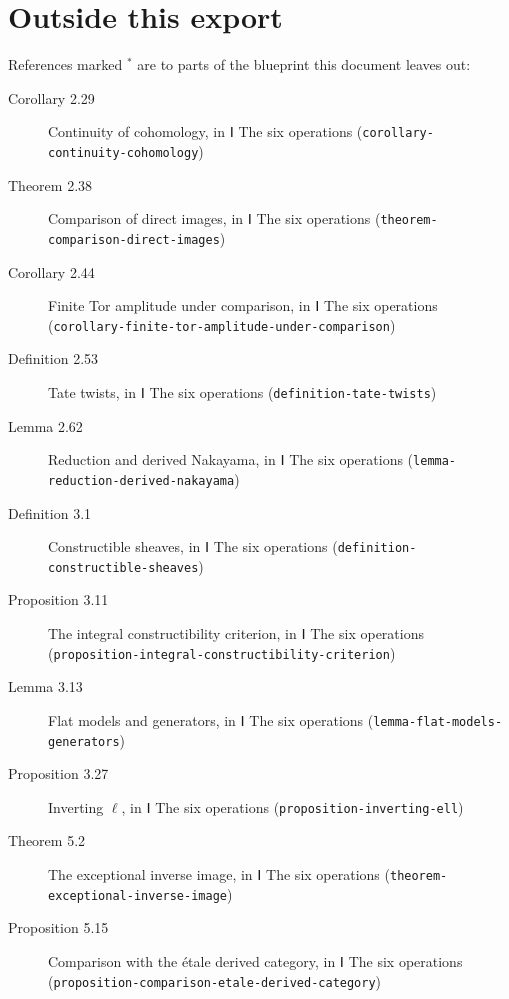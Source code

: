 \documentclass[11pt]{article}
\newcommand{\bpslug}[1]{\texttt{#1}}
\begin{document}
\section*{Outside this export}
References marked \ensuremath{{}^\ast} are to parts of the blueprint this document leaves out:
\begin{description}
\item[Corollary 2.29] Continuity of cohomology, in Ⅰ The six operations (\bpslug{corollary-{}\allowbreak{}continuity-{}\allowbreak{}cohomology})
\item[Theorem 2.38] Comparison of direct images, in Ⅰ The six operations (\bpslug{theorem-{}\allowbreak{}comparison-{}\allowbreak{}direct-{}\allowbreak{}images})
\item[Corollary 2.44] Finite Tor amplitude under comparison, in Ⅰ The six operations (\bpslug{corollary-{}\allowbreak{}finite-{}\allowbreak{}tor-{}\allowbreak{}amplitude-{}\allowbreak{}under-{}\allowbreak{}comparison})
\item[Definition 2.53] Tate twists, in Ⅰ The six operations (\bpslug{definition-{}\allowbreak{}tate-{}\allowbreak{}twists})
\item[Lemma 2.62] Reduction and derived Nakayama, in Ⅰ The six operations (\bpslug{lemma-{}\allowbreak{}reduction-{}\allowbreak{}derived-{}\allowbreak{}nakayama})
\item[Definition 3.1] Constructible sheaves, in Ⅰ The six operations (\bpslug{definition-{}\allowbreak{}constructible-{}\allowbreak{}sheaves})
\item[Proposition 3.11] The integral constructibility criterion, in Ⅰ The six operations (\bpslug{proposition-{}\allowbreak{}integral-{}\allowbreak{}constructibility-{}\allowbreak{}criterion})
\item[Lemma 3.13] Flat models and generators, in Ⅰ The six operations (\bpslug{lemma-{}\allowbreak{}flat-{}\allowbreak{}models-{}\allowbreak{}generators})
\item[Proposition 3.27] Inverting $\ell$, in Ⅰ The six operations (\bpslug{proposition-{}\allowbreak{}inverting-{}\allowbreak{}ell})
\item[Theorem 5.2] The exceptional inverse image, in Ⅰ The six operations (\bpslug{theorem-{}\allowbreak{}exceptional-{}\allowbreak{}inverse-{}\allowbreak{}image})
\item[Proposition 5.15] Comparison with the étale derived category, in Ⅰ The six operations (\bpslug{proposition-{}\allowbreak{}comparison-{}\allowbreak{}etale-{}\allowbreak{}derived-{}\allowbreak{}category})

\end{description}
\end{document}
